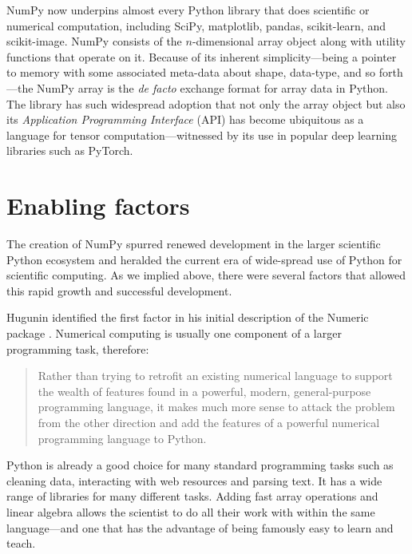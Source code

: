 NumPy now underpins almost every Python library that does scientific or
numerical computation, including SciPy\cite{virtanen2019scipy},
matplotlib\cite{hunter2007matplotlib}, pandas\cite{mckinney-proc-scipy-2010},
scikit-learn\cite{pedregosa2011scikit}, and
scikit-image\cite{vanderwalt2014scikit}.
NumPy consists of the $n$-dimensional array object along with utility functions
that operate on it.
Because of its inherent simplicity---being a pointer to memory with some
associated meta-data about shape, data-type, and so forth---the NumPy array is
the {\it de facto} exchange format for array data in Python.
The library has such widespread adoption that not only the array object but also its
{\it Application Programming Interface} (API) has become ubiquitous as
a language for tensor computation---witnessed by its use in popular
deep learning libraries such as PyTorch\cite{pytorch}.


\section*{Enabling factors}

The creation of NumPy spurred renewed development in the larger scientific
Python ecosystem and heralded the current era of wide-spread use of Python for
scientific computing.
As we implied above, there were several factors that allowed this rapid growth
and successful development.

Hugunin identified the first factor in his initial description of the Numeric
package \cite{Hugunin-whitepaper}.  Numerical computing is usually one
component of a larger programming task, therefore:

\begin{quote}
    Rather than trying to retrofit an existing numerical language to support
    the wealth of features found in a powerful, modern, general-purpose
    programming language, it makes much more sense to attack the problem from
    the other direction and add the features of a powerful numerical
    programming language to Python.
\end{quote}

Python is already a good choice for many standard programming tasks such as
cleaning data, interacting with web resources and parsing text.  It has a wide
range of libraries for many different tasks. Adding fast array operations and
linear algebra allows the scientist to do all their work with within the same
language---and one that has the advantage of being famously easy to learn and
teach.

